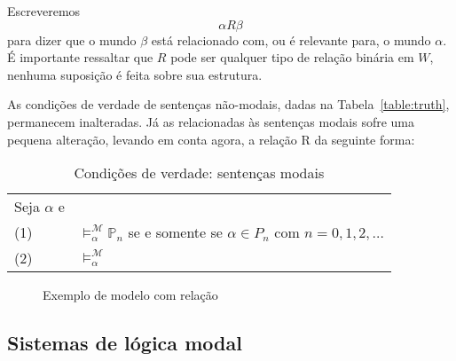 Escreveremos
\begin{equation}
    \alpha R \beta
\end{equation}
para dizer que o mundo $\beta$ está relacionado com, ou é relevante para, o
mundo $\alpha$. É importante ressaltar que $R$ pode ser qualquer tipo de relação
binária em $W$, nenhuma suposição é feita sobre sua estrutura.

As condições de verdade de sentenças não-modais, dadas na
Tabela~\ref{table:truth}, permanecem inalteradas. Já as relacionadas às
sentenças modais sofre uma pequena alteração, levando em conta agora, a relação
R da seguinte forma:

    \begin{table}[h!]
\label{table:truth2}
\begin{center}
    \caption{Condições de verdade: sentenças modais}
    \begin{tabular}{ll}
    Seja $\alpha$ e  \\

        \vspace{2mm}
        (1) & $\models ^{\mathcal{M}}_{\alpha} \mathbb{P}_n$ se e somente se $\alpha \in
        P_n$ com $n=0,1,2,\ldots$\\
        (2)  & $\models ^{\mathcal{M}}_{\alpha} $\\

    \end{tabular}
\end{center}
\end{table}

\begin{figure}
\begin{center}
\label{figure:mundos_relacao}
\caption{Exemplo de modelo com relação}
\end{center}
\end{figure}


\subsection{Sistemas de lógica modal}
\label{sec:sistemas}

